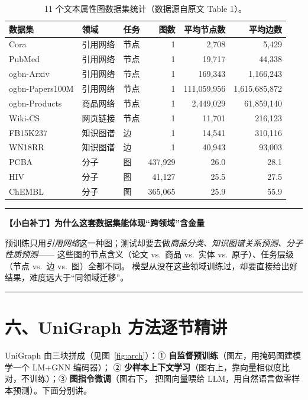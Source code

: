 \documentclass[11pt,UTF8,fontset=fandol]{ctexart}
\newenvironment{tip}[1]{%
  \par\smallskip\noindent\rule{\linewidth}{0.4pt}\par\nobreak
  \noindent\textbf{【小白补丁】#1}\par\nobreak\noindent\ignorespaces
}{%
  \par\noindent\rule{\linewidth}{0.4pt}\par\smallskip
}
\begin{document}
\begin{table}[H]\centering
\caption{11 个文本属性图数据集统计（数据源自原文 Table 1）。}
\label{tab:data}
\small
\begin{tabular}{lllrrr}
\toprule
\textbf{数据集} & \textbf{领域} & \textbf{任务} & \textbf{图数} & \textbf{平均节点数} & \textbf{平均边数} \\
\midrule
Cora            & 引用网络  & 节点 & 1       & 2{,}708       & 5{,}429 \\
PubMed          & 引用网络  & 节点 & 1       & 19{,}717      & 44{,}338 \\
ogbn-Arxiv      & 引用网络  & 节点 & 1       & 169{,}343     & 1{,}166{,}243 \\
ogbn-Papers100M & 引用网络  & 节点 & 1       & 111{,}059{,}956 & 1{,}615{,}685{,}872 \\
ogbn-Products   & 商品网络  & 节点 & 1       & 2{,}449{,}029  & 61{,}859{,}140 \\
Wiki-CS         & 网页链接  & 节点 & 1       & 11{,}701      & 216{,}123 \\
FB15K237        & 知识图谱  & 边   & 1       & 14{,}541      & 310{,}116 \\
WN18RR          & 知识图谱  & 边   & 1       & 40{,}943      & 93{,}003 \\
PCBA            & 分子      & 图   & 437{,}929 & 26.0        & 28.1 \\
HIV             & 分子      & 图   & 41{,}127  & 25.5        & 27.5 \\
ChEMBL          & 分子      & 图   & 365{,}065 & 25.9        & 55.9 \\
\bottomrule
\end{tabular}
\end{table}

\begin{tip}{为什么这套数据集能体现“跨领域”含金量}
预训练只用\emph{引用网络}这一种图；测试却要去做\emph{商品分类、知识图谱关系预测、分子性质预测}——
这些图的节点含义（论文 vs.\ 商品 vs.\ 实体 vs.\ 原子）、任务层级（节点 vs.\ 边 vs.\ 图）全都不同。
模型从没在这些领域训练过，却要直接给出好结果，难度远大于“同领域迁移”。
\end{tip}

\section{六、UniGraph 方法逐节精讲}

UniGraph 由三块拼成（见图~\ref{fig:arch}）：① \textbf{自监督预训练}（图左，用掩码图建模学一个 LM+GNN 编码器）；
② \textbf{少样本上下文学习}（图右上，靠向量相似度比对，不训练）；③ \textbf{图指令微调}（图右下，
把图向量喂给 LLM，用自然语言做零样本预测）。下面分别讲。
\end{document}
